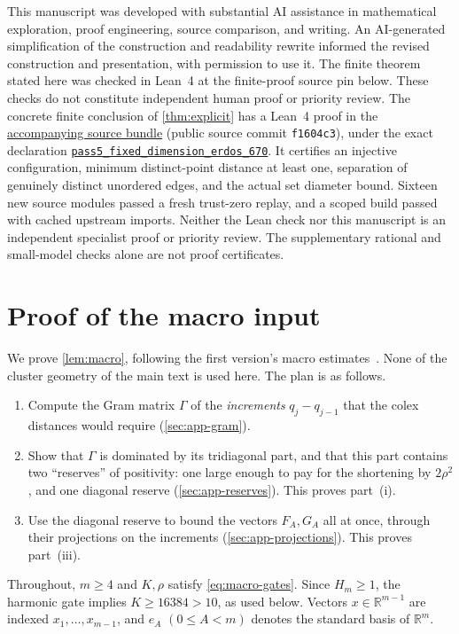 \documentclass[11pt]{amsart}
\numberwithin{equation}{section}
\theoremstyle{definition}
\theoremstyle{remark}
\newcommand{\R}{\mathbb R}
\begin{document}
This manuscript was developed with substantial AI assistance in mathematical
exploration, proof engineering, source comparison, and writing. An AI-generated
simplification of the construction and readability rewrite informed the revised
construction and presentation, with permission to use it. The finite theorem
stated here was checked in Lean~4 at the finite-proof source pin below. These checks do not
constitute independent human proof or priority review. The concrete finite
conclusion of \cref{thm:explicit} has a
Lean~4 proof in the \href{https://github.com/jjtripodo-lgtm/erdos-670-fixed-dimension/tree/f1604c368efce996a9af4d46f581e676e49054f5/lean}{accompanying source bundle}
(public source commit \texttt{f1604c3}), under the exact declaration
\href{https://github.com/jjtripodo-lgtm/erdos-670-fixed-dimension/blob/f1604c368efce996a9af4d46f581e676e49054f5/lean/Erdos488/Geometry/SeparatedDistances/FixedDimension/Pass5FixedDimension670.lean}{\texttt{pass5\_fixed\_dimension\_erdos\_670}}.
It certifies an injective configuration, minimum distinct-point distance
at least one, separation of genuinely distinct unordered edges, and the
actual set diameter bound. Sixteen new source modules passed a fresh
trust-zero replay, and a scoped build passed with cached upstream imports.
Neither the Lean check nor this manuscript is an independent specialist
proof or priority review. The supplementary rational and small-model
checks alone are not proof certificates.

\appendix
\section{Proof of the macro input}\label{app:macro}

We prove \cref{lem:macro}, following the first version's macro
estimates~\cite[Lemmas~2--3]{Tripodo}. None of the cluster geometry of
the main text is used here. The plan is as follows.
\begin{enumerate}[leftmargin=2em,itemsep=1pt]
\item Compute the Gram matrix $\Gamma$ of the \emph{increments}
 $q_j-q_{j-1}$ that the colex distances would require
 (\cref{sec:app-gram}).
\item Show that $\Gamma$ is dominated by its tridiagonal part, and that
 this part contains two ``reserves'' of positivity: one large
 enough to pay for the shortening by $2\rho^2$, and one diagonal reserve
 (\cref{sec:app-reserves}). This proves part~(i).
\item Use the diagonal reserve to bound the vectors $F_A,G_A$ all at once,
 through their projections on the increments (\cref{sec:app-projections}).
 This proves part~(iii).
\end{enumerate}
Throughout, $m\ge4$ and $K,\rho$ satisfy \eqref{eq:macro-gates}. Since
$H_m\ge1$, the harmonic gate implies $K\ge16384>10$, as used below. Vectors
$x\in\R^{m-1}$ are indexed $x_1,\dots,x_{m-1}$, and $e_A$ $(0\le A<m)$
denotes the standard basis of $\R^m$.
\end{document}
